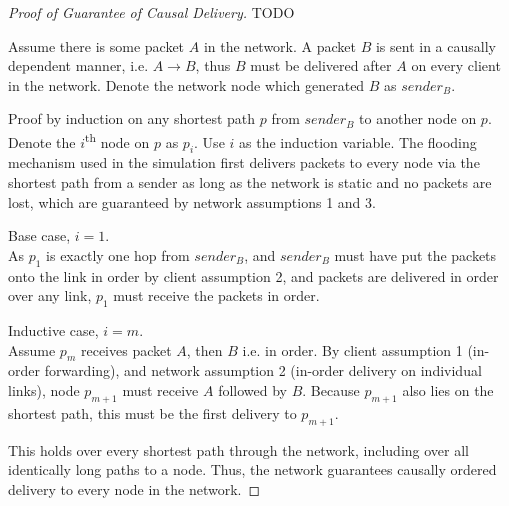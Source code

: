 \documentclass[12pt,a4paper,twoside,openright]{report}
\begin{document}
		\begin{proof}[Proof of Guarantee of Causal Delivery] TODO
		
		Assume there is some packet $A$ in the network. A packet $B$ is sent in a causally dependent manner, i.e. $A \rightarrow B$, thus $B$ must be delivered after $A$ on every client in the network. Denote the network node which generated $B$ as $sender_B$.
		
		Proof by induction on any shortest path $p$ from $sender_B$ to another node on $p$. Denote the $i$\textsuperscript{th} node on $p$ as $p_i$. Use $i$ as the induction variable. The flooding mechanism used in the simulation first delivers packets to every node via the shortest path from a sender as long as the network is static and no packets are lost, which are guaranteed by network assumptions 1 and 3.
		
		Base case, $i = 1$.\\
		As $p_1$ is exactly one hop from $sender_B$, and $sender_B$ must have put the packets onto the link in order by client assumption 2, and packets are delivered in order over any link, $p_1$ must receive the packets in order.
		
		Inductive case, $i = m$.\\
		Assume $p_m$ receives packet $A$, then $B$ i.e. in order. By client assumption 1 (in-order forwarding), and network assumption 2 (in-order delivery on individual links), node $p_{m+1}$ must receive $A$ followed by $B$. Because $p_{m+1}$ also lies on the shortest path, this must be the first delivery to $p_{m+1}$.
		
		This holds over every shortest path through the network, including over all identically long paths to a node. Thus, the network guarantees causally ordered delivery to every node in the network.
		
		
		

\end{proof}
\end{document}
